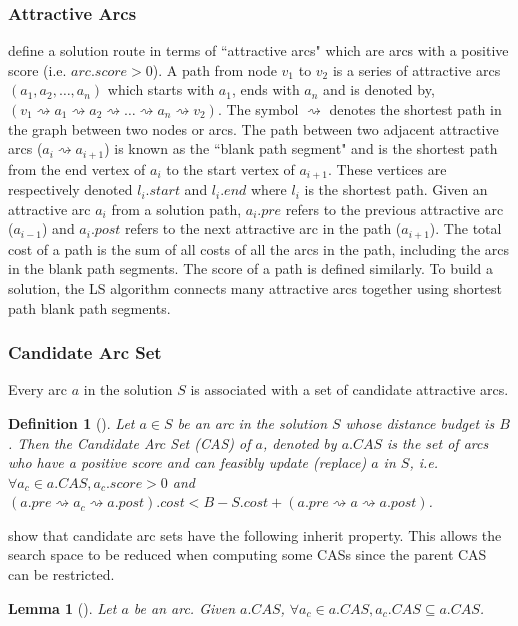 \documentclass[11pt]{article}
\newtheorem{lemma}{Lemma}
\newtheorem{definition}{Definition}
\newcommand{\sse}{\subseteq} %
\newcommand{\spa}{\rightsquigarrow}
\begin{document}
\subsubsection{Attractive Arcs}
\citeauthor{lu2015arc} define a solution route in terms of ``attractive arcs" which are arcs with a positive score (i.e. $arc.score > 0$). A path from node $v_1$ to $v_2$ is a series of attractive arcs $(a_1, a_2, \ldots, a_n)$ which starts with $a_1$, ends with $a_n$ and is denoted by, $(v_1 \spa a_1 \spa a_2 \spa \ldots \spa a_n \spa v_2)$. The symbol $\spa$ denotes the shortest path in the graph between two nodes or arcs. The path between two adjacent attractive arcs ($a_i \spa  a_{i+1}$) is known as the ``blank path segment" and is the shortest path from the end vertex of $a_i$ to the start vertex of $a_{i+1}$. These vertices are respectively denoted $l_i.start$ and $l_i.end$ where $l_i$ is the shortest path. Given an attractive arc $a_i$ from a solution path, $a_i.pre$ refers to the previous attractive arc ($a_{i-1}$) and $a_i.post$ refers to the next attractive arc in the path ($a_{i+1}$). The total cost of a path is the sum of all costs of all the arcs in the path, including the arcs in the blank path segments. The score of a path is defined similarly. To build a solution, the LS algorithm connects many attractive arcs together using shortest path blank path segments.

\subsubsection{Candidate Arc Set}
Every arc $a$ in the solution $S$ is associated with a set of candidate attractive arcs. 
%
%
\begin{definition}[\cite{lu2015arc}]
    Let $a \in S$ be an arc in the solution $S$ whose distance budget is $B$. Then the Candidate Arc Set (CAS) of $a$, denoted by $a.CAS$ is the set of arcs who have a positive score and can feasibly update (replace) $a$ in $S$, i.e. $\forall a_c \in a.CAS, a_c.score > 0$ and $(a.pre \spa a_c \spa a.post).cost < B - S.cost + (a.pre \spa a \spa a.post)$.
\end{definition}

\citeauthor{lu2015arc} show that candidate arc sets have the following inherit property. This allows the search space to be reduced when computing some CASs since the parent CAS can be restricted.
\begin{lemma}[\cite{lu2015arc}] Let $a$ be an arc. Given $a.CAS$, $\forall a_c \in a.CAS, a_c.CAS \sse a.CAS$.
\end{lemma}
\end{document}

